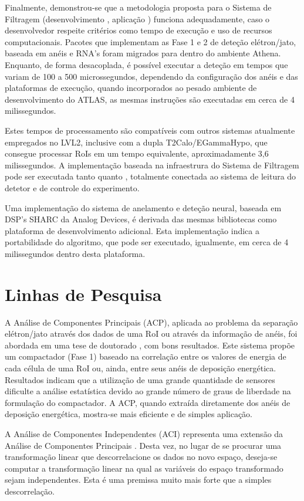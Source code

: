 Finalmente, demonstrou-se que a metodologia proposta para o Sistema de
Filtragem (desenvolvimento , aplicação ) funciona
adequadamente, caso o desenvolvedor respeite critérios como tempo de execução
e uso de recursos computacionais. Pacotes que implementam as Fase 1 e 2 de
deteção elétron/jato, baseada em anéis e RNA's foram migrados para dentro do
ambiente Athena. Enquanto, de forma desacoplada, é possível executar a
deteção em tempos que variam de 100 a 500 microssegundos, dependendo da
configuração dos anéis e das plataformas de execução, quando incorporados ao
pesado ambiente de desenvolvimento do ATLAS, as mesmas instruções são
executadas em cerca de 4 milissegundos.

Estes tempos de processamento são compatíveis com outros sistemas atualmente
empregados no LVL2, inclusive com a dupla T2Calo/EGammaHypo, que consegue
processar RoIs em um tempo equivalente, aproximadamente 3,6 milissegundos. A
implementação baseada na infraestrura do Sistema de Filtragem pode ser
executada tanto  quanto , totalmente conectada ao
sistema de leitura do detetor e de controle do experimento.

Uma implementação do sistema de anelamento e deteção neural, baseada em DSP's
SHARC da Analog Devices, é derivada das mesmas bibliotecas como plataforma de
desenvolvimento adicional. Esta implementação indica a portabilidade do
algoritmo, que pode ser executado, igualmente, em cerca de 4 milissegundos
dentro desta plataforma.

\section{Linhas de Pesquisa}

A Análise de Componentes Principais (ACP), aplicada ao problema da separação
elétron/jato através dos dados de uma RoI ou através da informação de anéis,
foi abordada em uma tese de doutorado \cite{herman}, com bons resultados. Este
sistema propõe um compactador (Fase 1) baseado na correlação entre os valores
de energia de cada célula de uma RoI ou, ainda, entre seus anéis de deposição
energética. Resultados indicam que a utilização de uma grande quantidade de
sensores dificulte a análise estatística devido ao grande número de graus de
liberdade na formulação do compactador. A ACP, quando extraída diretamente dos
anéis de deposição energética, mostra-se mais eficiente e de simples
aplicação.

A Análise de Componentes Independentes (ACI) representa uma extensão da
Análise de Componentes Principais \cite{oja-ica}. Desta vez, no lugar de se
procurar uma transformação linear que descorrelacione os dados no novo espaço,
deseja-se computar a transformação linear na qual as variáveis do espaço
transformado sejam independentes. Esta é uma premissa muito mais forte que
a simples descorrelação.

